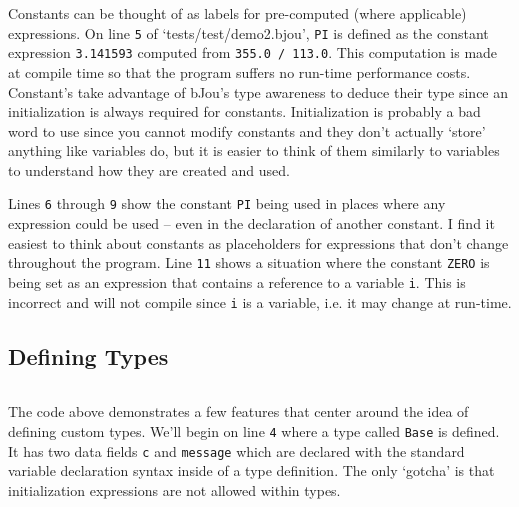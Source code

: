 \documentclass[12pt]{article}
\begin{document}
		Constants can be thought of as labels for pre-computed (where applicable) expressions. On line \texttt{5} of `tests/test/demo2.bjou', \texttt{PI} is defined as the constant expression \texttt{3.141593} computed from \texttt{355.0 / 113.0}. This computation is made at compile time so that the program suffers no run-time performance costs. Constant's take advantage of bJou's type awareness to deduce their type since an initialization is always required for constants. Initialization is probably a bad word to use since you cannot modify constants and they don't actually `store' anything like variables do, but it is easier to think of them similarly to variables to understand how they are created and used.
		
		Lines \texttt{6} through \texttt{9} show the constant \texttt{PI} being used in places where any expression could be used -- even in the declaration of another constant. I find it easiest to think about constants as placeholders for expressions that don't change throughout the program. Line \texttt{11} shows a situation where the constant \texttt{ZERO} is being set as an expression that contains a reference to a variable \texttt{i}. This is incorrect and will not compile since \texttt{i} is a variable, i.e. it may change at run-time.

	\subsection*{Defining Types}
		\begin{centering}
			\inputminted[breaklines, fontsize=\small, baselinestretch=0.8, frame=lines, linenos]{bash}{"../tests/test/demo3.bjou"}
		\end{centering}

		The code above demonstrates a few features that center around the idea of defining custom types. We'll begin on line \texttt{4} where a type called \texttt{Base} is defined. It has two data fields \texttt{c} and \texttt{message} which are declared with the standard variable declaration syntax inside of a type definition. The only `gotcha' is that initialization expressions are not allowed within types.
		
\end{document}
